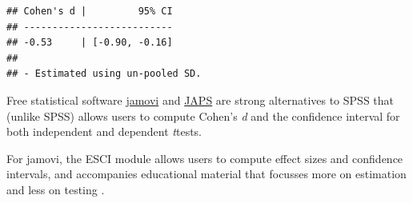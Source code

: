 \documentclass[
  oneside]{book}
\begin{document}
\begin{verbatim}
## Cohen's d |         95% CI
## --------------------------
## -0.53     | [-0.90, -0.16]
## 
## - Estimated using un-pooled SD.
\end{verbatim}

Free statistical software \href{https://www.jamovi.org/}{jamovi} and \href{https://jasp-stats.org/}{JAPS} are strong alternatives to SPSS that (unlike SPSS) allows users to compute Cohen's \emph{d} and the confidence interval for both independent and dependent \emph{t}tests.

For jamovi, the ESCI module allows users to compute effect sizes and confidence intervals, and accompanies educational material that focusses more on estimation and less on testing \citep{cumming_introduction_2016}.

\begin{figure}


\end{figure}
\end{document}
